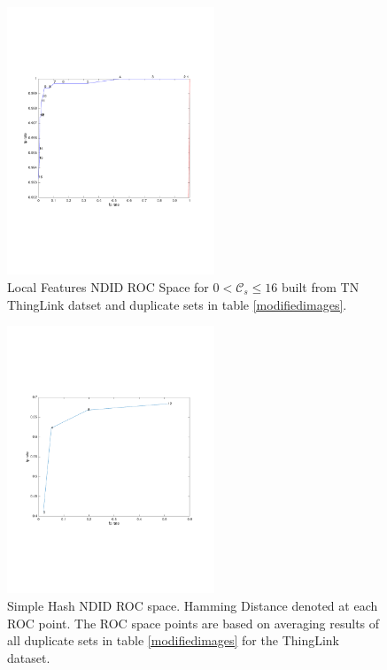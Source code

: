 \documentclass[english,12pt,a4paper,pdftex,elec,utf8, table]{aaltothesis}
\begin{document}
\begin{figure}[htb]
\begin{center}
\includegraphics[height=8cm]{figures/thinglink_SIFTROCperCutoff}
\end{center}
\caption{ Local Features NDID ROC Space for $0 < \mathcal{C}_{s} \leq 16$ built from TN ThingLink datset and duplicate sets in table \ref{modifiedimages}.}
\label{thinglinkfigcutoffrocspace}
\end{figure}

\begin{figure}[htb]
\begin{center}
\includegraphics[height=8cm]{figures/thinglink_simpleTotalROC}
\end{center}
\caption{Simple Hash NDID ROC space. Hamming Distance denoted at each ROC point. The ROC space points are based on averaging results of all duplicate sets in table \ref{modifiedimages} for the ThingLink dataset. }
\label{thinglinksimpletotalroc}
\end{figure}
\end{document}
